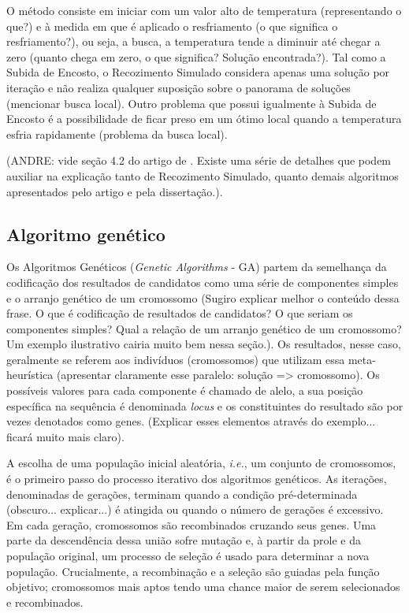 O método consiste em iniciar com um valor alto de temperatura (representando o que?) e à medida em que é aplicado o resfriamento (o que significa o resfriamento?), ou seja, a busca, a temperatura tende a diminuir até chegar a zero (quanto chega em zero, o que significa? Solução encontrada?). Tal como a Subida de Encosto, o Recozimento Simulado considera apenas uma solução por iteração e não realiza qualquer suposição sobre o panorama de soluções (mencionar busca local). Outro problema que possui igualmente à Subida de Encosto é a possibilidade de ficar preso em um ótimo local quando a temperatura esfria rapidamente (problema da busca local).

(ANDRE: vide seção 4.2 do artigo de \cite{youssef2001167}. Existe uma série de detalhes que podem auxiliar na explicação tanto de Recozimento Simulado, quanto demais algoritmos apresentados pelo artigo e pela dissertação.).

\subsection{Algoritmo genético}

Os Algoritmos Genéticos (\textit{Genetic Algorithms} - GA) partem da semelhança da codificação dos resultados de candidatos como uma série de componentes simples e o arranjo genético de um cromossomo \cite{alander1998genetic} (Sugiro explicar melhor o conteúdo dessa frase. O que é codificação de resultados de candidatos? O que seriam os componentes simples? Qual a relação de um arranjo genético de um cromossomo? Um exemplo ilustrativo cairia muito bem nessa seção.). Os resultados, nesse caso, geralmente se referem aos indivíduos (cromossomos) que utilizam essa meta-heurística (apresentar claramente esse paralelo: solução => cromossomo). Os possíveis valores para cada componente é chamado de alelo, a sua posição específica na sequência é denominada \textit{locus} e os constituintes do resultado são por vezes denotados como genes. (Explicar esses elementos através do exemplo... ficará muito mais claro).

A escolha de uma população inicial aleatória, \textit{i.e.}, um conjunto de cromossomos, é o primeiro passo do processo iterativo dos algoritmos genéticos.  As iterações, denominadas de gerações, terminam quando a condição pré-determinada (obscuro... explicar...) é atingida ou quando o número de gerações é excessivo. Em cada geração, cromossomos são recombinados cruzando seus genes. Uma parte da descendência dessa união sofre mutação e, à partir da prole e da população original, um processo de seleção é usado para determinar a nova população.  Crucialmente, a recombinação e a seleção são guiadas pela função objetivo; cromossomos mais aptos tendo uma chance maior de serem selecionados e recombinados.

